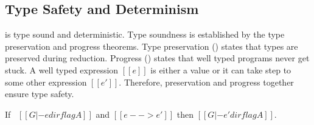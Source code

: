 
\begin{comment}
\paragraph{Dynamic Type} The dynamic semantics employs a simple
function that retrieves the dynamic type of a pre-value.
The definition is shown in the lower part of \Cref{fig:union:os}.
$[[Int]]$ is returned when $[[p]]$ is an integer $[[i]]$.
Otherwise, for functions, the function annotation $[[A -> B]]$ is returned.
\end{comment}



\subsection{Type Safety and Determinism}
\label{sec:union:safety}
\cal is type sound and deterministic. Type soundness is established
by the type preservation and progress
theorems. Type preservation () states that
types are preserved during reduction. Progress
() states that well typed programs never get
stuck.  A well typed expression $[[e]]$ is either a value or it can
take step to some other expression $[[e']]$. Therefore, preservation and progress
together ensure type safety.

\begin{theorem}
\label{lemma:union:preservation}
  If \ $[[G |- e dirflag A]]$ and $[[e --> e']]$ then $[[G |- e' dirflag A]]$.
\end{theorem}

